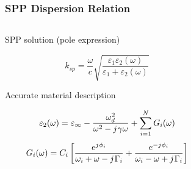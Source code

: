\documentclass[10pt]{beamer}
\renewcommand{\O}{\omega}  %
\newcommand{\E}{\varepsilon}  %
\renewcommand{\inf}{\infty}  %
\renewcommand{\j}{{j}\mkern1mu} %
\begin{document}
\begin{frame}
    \frametitle{SPP Dispersion Relation}
    \begin{columns}[T] %
        \begin{column}{.5\textwidth}
            \begin{outline}[itemize]
                \1 SPP solution (pole expression)
            \end{outline}
            \begin{equation} \nonumber
                k_{sp}=\frac{\O}{c}\sqrt {\dfrac {\E_{1}\E_{2}(\O)} {\E_{1} + \E_{2}(\O)}}
                \label{eq:dis_spp}
            \end{equation}
            \begin{outline}[itemize]
                \1 Accurate material description
            \end{outline}
            \begin{equation} \nonumber
                \E_2(\O) = \E_{\inf} - \frac{\O_{d}^{2}}{\O^2 - \j\gamma \O} + \sum \limits_{i = 1}^N G_i(\O)
                \label{eq:eps_drude_cp}
            \end{equation}
            \begin{equation} \nonumber
                G_i(\O) = C_i \left[ \frac{e^{\j \phi_i}}{\O_i + \O - \j \Gamma_i} + \frac{e^{-\j \phi_i}}{\O_i - \O + \j \Gamma_i} \right]
                \label{eq:CP_terms}
            \end{equation}
        \end{column}
        \begin{column}[T]{.45\textwidth}
            \centering
            \begin{figure}

            \end{figure}
        \end{column}
    \end{columns}
\end{frame}
\end{document}
